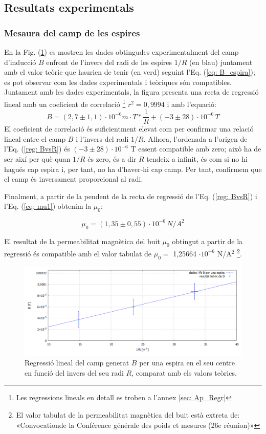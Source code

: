 \documentclass[11pt]{article}
\numberwithin{equation}{section}
\numberwithin{figure}{section}
\numberwithin{table}{section}
\begin{document}
\subsection{Resultats experimentals}\label{sec: resultats}
\subsubsection{Mesaura del camp de les espires}\label{subsec: espires}

En la Fig. (\ref{fig:BvsR}) es mostren les dades obtingudes experimentalment del camp d'inducció $B$ enfront de l'invers del radi de les espires $1/R$ (en blau) juntament amb el valor teòric que haurien de tenir (en verd) seguint l'Eq. (\ref{eq: B_espira}); es pot observar com les dades experimentals i teòriques són compatibles.
Juntament amb les dades experimentals, la figura presenta una recta de regressió lineal amb un coeficient de correlació \footnote{Les regressions lineals en detall es troben a l'annex \ref{sec: Ap_Regr}} $r^2 = 0,9994$ i amb l'equació: 
\begin{equation} \label{reg: BvsR}
    B = (2,7\pm 1,1) \cdot10^{-6} m\cdot T*\frac{1}{R}+(-3 \pm 28)\cdot10^{-6} \, T
\end{equation}
El coeficient de correlació és suficientment elevat com per confirmar una relació lineal entre el camp $B$ i l'invers del radi $1/R$.
Alhora, l'ordenada a l'origen de l'Eq. (\ref{reg: BvsR}) és $(-3 \pm 28)\cdot10^{-6}$ T essent compatible amb zero; això ha de ser així per què quan $1/R$ és zero, és a dir $R$ tendeix a infinit, és com si no hi hagués cap espira i, per tant, no ha d'haver-hi cap camp. Per tant, confirmem que el camp és inversament proporcional al radi.

Finalment, a partir de la pendent de la recta de regressió de l'Eq. (\ref{reg: BvsR}) i l'Eq. (\ref{eq: mu1}) obtenim la $\mu_0$:

\[
\boxed{\mu_0=(1,35\pm0,55)\cdot10^{-6} \, N/A^2}
\]

El resultat de la permeabilitat magnètica del buit $\mu_0$ obtingut a partir de la regressió és compatible amb el valor tabulat de $\mu_0 =$  1,25664 $\cdot 10^{-6}$ N/A$^2$ \footnote{El valor tabulat de la permeabilitat magnètica del buit està extreta de: «Convocationde la Conférence générale des poids et mesures (26e réunion)»}.

\begin{figure}[H]
    \centering
    \includegraphics[width=1\linewidth]{BvsR.PNG}
    \caption{Regressió lineal del camp generat $B$ per una espira en el seu centre en funció del invers del seu radi $R$, comparat amb els valors teòrics.}
    \label{fig:BvsR}
\end{figure}
\end{document}
